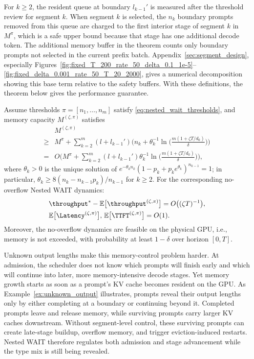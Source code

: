 For \(k\ge2\), the resident queue at boundary \(l_{k-1}'\) is measured after the threshold review for segment \(k\). When segment \(k\) is selected, the \(n_k\) boundary prompts removed from this queue are charged to the first interior stage of segment \(k\) in \(M^\pi\), which is a safe upper bound because that stage has one additional decode token. The additional memory buffer in the theorem counts only boundary prompts not selected in the current prefix batch. Appendix~\ref{sec:segment_design}, especially Figures~\ref{fig:fixed_T_200_rate_50_delta_0.1_1e-5}--\ref{fig:fixed_delta_0.001_rate_50_T_20_2000}, gives a numerical decomposition showing this base term relative to the safety buffers. With these definitions, the theorem below gives the performance guarantee.

\begin{theorem}
\label{thm:nested_wait_heavy_traffic}
Assume thresholds \( \pi = [n_1, \dots, n_m] \) satisfy \eqref{eq:nested_wait_thresholds}, and memory capacity \(M^{(\zeta,\pi)}\) satisfies
\begin{equation}
    \label{eq:nested_wait_memory_total}
\begin{aligned}
    &M^{(\zeta,\pi)}\\
\geq &M^\pi + \sum_{k=2}^m (l + l_{k-1}') \bigg(n_k + \theta_k^{-1} \ln\Big( \frac{m(1+\zeta T/d_0)}{\delta} \Big)\bigg) \\
=& O\bigg( M^\pi + \sum_{k=2}^m (l + l_{k-1}') \theta_k^{-1}\ln\Big( \frac{m(1+\zeta T/d_0)}{\delta} \Big) \bigg),
\end{aligned}
\end{equation}
where $\theta_k>0$ is the unique solution of \(e^{-\theta_k n_k}(1-p_k+p_ke^{\theta_k})^{n_{k-1}}=1\); in particular, $\theta_k \geq 8(n_k - n_{k-1}p_k)/n_{k-1}$ for \(k\ge 2\). For the corresponding no-overflow Nested WAIT dynamics:
$$
    \begin{aligned}
        &\throughput^* - \mathbb{E}\big[ \throughput^{(\zeta, \pi)} \big] 
   = O\big( (\zeta T)^{-1} \big), \\
&\mathbb{E}\big[ \Latency^{(\zeta, \pi)} \big],\,\mathbb{E}\big[ \TTFT^{(\zeta, \pi)} \big] = O(1).
    \end{aligned}
$$
Moreover, the no-overflow dynamics are feasible on the physical GPU, i.e., memory is not exceeded, with probability at least \(1-\delta\) over horizon \([0,T]\).
\end{theorem}

Unknown output lengths make this memory-control problem harder. At admission, the scheduler does not know which prompts will finish early and which will continue into later, more memory-intensive decode stages. Yet memory growth starts as soon as a prompt's KV cache becomes resident on the GPU. As Example~\ref{ex:unknown_output} illustrates, prompts reveal their output lengths only by either completing at a boundary or continuing beyond it. Completed prompts leave and release memory, while surviving prompts carry larger KV caches downstream. Without segment-level control, these surviving prompts can create late-stage buildup, overflow memory, and trigger eviction-induced restarts. Nested WAIT therefore regulates both admission and stage advancement while the type mix is still being revealed.

